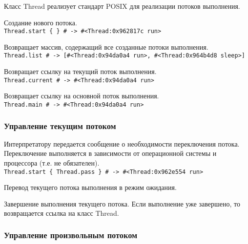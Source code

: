 Класс Thread реализует стандарт POSIX для реализации потоков выполнения.

\begin{methodlist}
  Создание нового потока.
  \\\verb!Thread.start { } # -> #<Thread:0x962817c run>!

  Возвращает массив, содержащий все созданные потоки выполнения. 
  \\\verb!Thread.list # -> [#<Thread:0x94da0a4 run>, #<Thread:0x964b4d8 sleep>]!

  Возвращает ссылку на текущий поток выполнения. 
  \\\verb!Thread.current # -> #<Thread:0x94da0a4 run>!
 
  Возвращает ссылку на основной поток выполнения. 
  \\\verb!Thread.main # -> #<Thread:0x94da0a4 run>!
\end{methodlist}

\subsubsection*{Управление текущим потоком}

\begin{methodlist}
  Интерпретатору передается сообщение о необходимости переключения потока. Переключение выполняется в зависимости от операционной системы и процессора (т.е. не обязателен). 
  \\\verb!Thread.start { Thread.pass } # -> #<Thread:0x962e554 run>!

  Перевод текущего потока выполнения в режим ожидания.

  Завершение выполнения текущего потока. Если выполнение уже завершено, то возвращается ссылка на класс Thread.
\end{methodlist}

\subsubsection*{Управление произвольным потоком}

